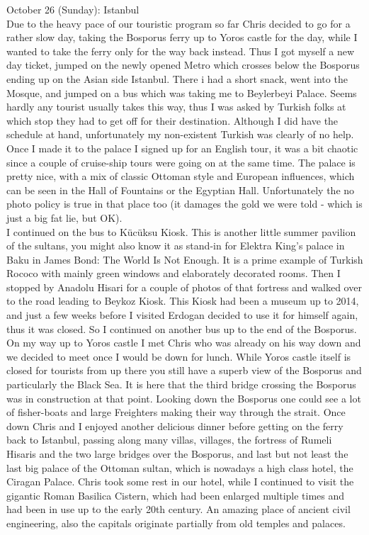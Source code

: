October 26 (Sunday): Istanbul\\
Due to the heavy pace of our touristic program so far Chris decided to go for a rather slow day, taking the Bosporus ferry up to Yoros castle for the day, while I wanted to take the ferry only for the way back instead. Thus I got myself a new day ticket, jumped on the newly opened Metro which crosses below the Bosporus ending up on the Asian side Istanbul. There i had a short snack, went into the Mosque, and jumped on a bus which was taking me to Beylerbeyi Palace. Seems hardly any tourist usually takes this way, thus I was asked by Turkish folks at which stop they had to get off for their destination. Although I did have the schedule at hand, unfortunately my non-existent Turkish was clearly of no help. Once I made it to the palace I signed up for an English tour, it was a bit chaotic since a couple of cruise-ship tours were going on at the same time. The palace is pretty nice, with a mix of classic Ottoman style and European influences, which can be seen in the Hall of Fountains or the Egyptian Hall. Unfortunately the no photo policy is true in that place too (it damages the gold we were told - which is just a big fat lie, but OK).\\
I continued on the bus to K\"uc\"uksu Kiosk. This is another little summer pavilion of the sultans, you might also know it as stand-in for Elektra King's palace in Baku in James Bond: The World Is Not Enough. It is a prime example of Turkish Rococo with mainly green windows and elaborately decorated rooms. Then I stopped by Anadolu Hisari for a couple of photos of that fortress and walked over to the road leading to Beykoz Kiosk. This Kiosk had been a museum up to 2014, and just a few weeks before I visited Erdogan decided to use it for himself again, thus it was closed. So I continued on another bus up to the end of the Bosporus.\\
On my way up to Yoros castle I met Chris who was already on his way down and we decided to meet once I would be down for lunch. While Yoros castle itself is closed for tourists from up there you still have a superb view of the Bosporus and particularly the Black Sea. It is here that the third bridge crossing the Bosporus was in construction at that point. Looking down the Bosporus one could see a lot of fisher-boats and large Freighters making their way through the strait. Once down Chris and I enjoyed another delicious dinner before getting on the ferry back to Istanbul, passing along many villas, villages, the fortress of Rumeli Hisaris and the two large bridges over the Bosporus, and last but not least the last big palace of the Ottoman sultan, which is nowadays a high class hotel, the Ciragan Palace. Chris took some rest in our hotel, while I continued to visit the gigantic Roman Basilica Cistern, which had been enlarged multiple times and had been in use up to the early 20th century. An amazing place of ancient civil engineering, also the capitals originate partially from old temples and palaces.\\

